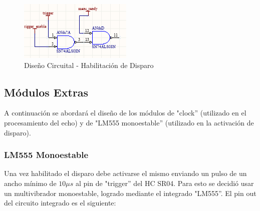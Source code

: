 \begin{figure}[H]
\begin{centering}
\includegraphics[scale=0.8]{habilitacionDeDisparo.PNG}
\caption{Diseño Circuital - Habilitación de Disparo}
\par\end{centering}
\end{figure}

\subsection{Módulos Extras}

A continuación se abordará el diseño de los módulos de "clock''
(utilizado en el procesamiento del echo) y de "LM555 monoestable''
(utilizado en la activación de disparo).

\subsubsection{LM555 Monoestable}

Una vez habilitado el disparo debe activarse el mismo enviando un
pulso de un ancho mínimo de $10\mu s$ al pin de "trigger'' del
HC SR04. Para esto se decidió usar un multivibrador monoestable, logrado
mediante el integrado "LM555''. El pin out del circuito integrado
es el siguiente:

